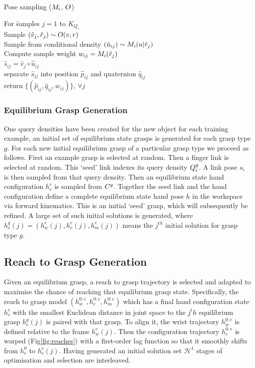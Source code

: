 \begin{algorithmbox}[floatplacement=t,float,fontupper=\small,label={alg:mc}]{Pose sampling ($M_i${,} $O$)}
\begin{minipage}{\linewidth}\begin{tabbing}%
For \= samples $j=1$ to $K_{Q_i}$\\
  \> Sample $(\hat{v}_j, \hat{r}_j) \sim O(v, r)$\\
  \> Sample from conditional density $(\hat{u}_{ij}) \sim M_i(u|\hat{r}_j)$\\
	\> Compute sample weight $w_{ij} = M_i(\hat{r}_j)$\\
	\> $\hat{s}_{ij} = \hat{v}_{j} \circ \hat{u}_{ij}$ \\
	\> separate $\hat{s}_{ij}$ into position $\hat{p}_{ij}$ and quaternion $\hat{q}_{ij}$\\
return $\{  (\hat{p}_{ij}, \hat{q}_{ij}, w_{ij} ) \}, \,  \forall j $
\end{tabbing}\end{minipage}
\end{algorithmbox}

\subsubsection{Equilibrium Grasp Generation} 
One query densities have been created for the new object for each training example, an initial set of equilibrium state grasps is generated for each grasp type $g$. For each new initial equilibrium grasp of a particular grasp type we proceed as follows. First an example grasp is selected at random. Then a finger link is selected at random. This ‘seed’ link indexes its query density $Q_i^g$. A link pose $s_i$ is then sampled from that query density. Then an equilibrium state hand configuration $h^e_c$ is sampled from $C^g$. Together the seed link and the hand configuration define a complete equilibrium state hand pose $h$ in the workspace via forward kinematics. This is an initial `seed' grasp, which will subsequently be refined. A large set of such initial solutions is generated, where $h_e^g(j)=(h_w^{e}(j) , h_c^{e}(j) , h_m^{e}(j))$ means the $j^{th}$ initial solution for  grasp type $g$. 

\subsection{Reach to Grasp Generation}
Given an equilibrium grasp, a reach to grasp trajectory is selected and adapted to maximise the chance of reaching that equilibrium grasp state. Specifically, the reach to grasp model $(h_w^{0:e} , h_c^{0:e} , h_m^{0:e})$ which has a final hand configuration state $h^e_c$ with the smallest Euclidean distance in joint space to the $j^th$ equilibrium grasp $h_e^g(j)$ is paired with that grasp. To align it, the wrist trajectory $h_w^{0:e}$ is defined relative to the frame $h_w^{e}(j)$. Then the configuration trajectory $h_c^{0:e}$ is warped (Fig\ref{fig:reaches}) with a first-order lag function so that it smoothly shifts from $h_c^{0}$ to $h_c^{e}(j)$. Having generated an initial solution set $\mathcal{H}^{1}$ stages of optimisation and selection are interleaved.

